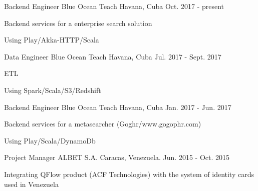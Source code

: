 


\begin{cventries}


\cventry
{Backend Engineer} %
{Blue Ocean Teach} %
{Havana, Cuba} %
{Oct. 2017 - present} %
{ %
\begin{cvitems}
  \item {Backend services for a enterprise search solution}
  \item {Using Play/Akka-HTTP/Scala}
\end{cvitems}
}



\cventry
{Data Engineer} %
{Blue Ocean Teach} %
{Havana, Cuba} %
{Jul. 2017 - Sept. 2017} %
{ %
\begin{cvitems}
  \item {ETL}
  \item {Using Spark/Scala/S3/Redshift}
\end{cvitems}
}



\cventry
{Backend Engineer} %
{Blue Ocean Teach} %
{Havana, Cuba} %
{Jan. 2017 - Jun. 2017} %
{ %
\begin{cvitems}
  \item {Backend services for a metasearcher (Goghr/www.gogophr.com)}
  \item {Using Play/Scala/DynamoDb}
\end{cvitems}
}


\cventry
{Project Manager} %
{ALBET S.A.} %
{Caracas, Venezuela.} %
{Jun. 2015 - Oct. 2015} %
{ %
\begin{cvitems}
\item {Integrating QFlow product (ACF Technologies) with the system of identity cards used in Venezuela}
\end{cvitems}
}


\end{cventries}
